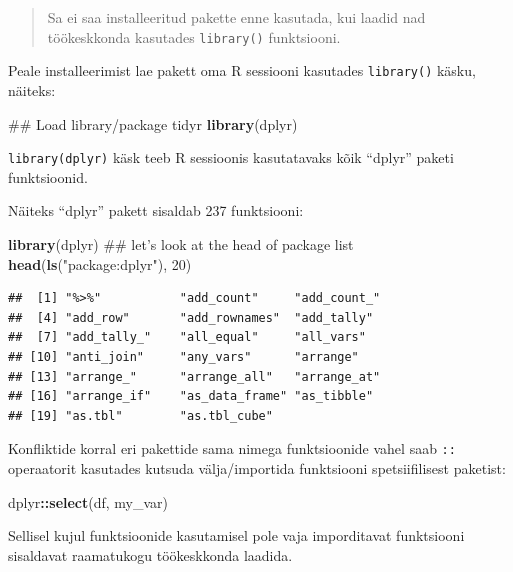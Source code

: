 \documentclass[]{book}
\newenvironment{Shaded}{\begin{snugshade}}{\end{snugshade}}
\newcommand{\KeywordTok}[1]{\textcolor[rgb]{0.13,0.29,0.53}{\textbf{#1}}}
\newcommand{\DecValTok}[1]{\textcolor[rgb]{0.00,0.00,0.81}{#1}}
\newcommand{\StringTok}[1]{\textcolor[rgb]{0.31,0.60,0.02}{#1}}
\newcommand{\OperatorTok}[1]{\textcolor[rgb]{0.81,0.36,0.00}{\textbf{#1}}}
\newcommand{\NormalTok}[1]{#1}
\begin{document}
\begin{quote}
Sa ei saa installeeritud pakette enne kasutada, kui laadid nad
töökeskkonda kasutades \texttt{library()} funktsiooni.
\end{quote}

Peale installeerimist lae pakett oma R sessiooni kasutades
\texttt{library()} käsku, näiteks:

\begin{Shaded}
\begin{Highlighting}[]
\NormalTok{## Load library/package tidyr}
\KeywordTok{library}\NormalTok{(dplyr)}
\end{Highlighting}
\end{Shaded}

\texttt{library(dplyr)} käsk teeb R sessioonis kasutatavaks kõik
``dplyr'' paketi funktsioonid.

Näiteks ``dplyr'' pakett sisaldab 237 funktsiooni:

\begin{Shaded}
\begin{Highlighting}[]
\KeywordTok{library}\NormalTok{(dplyr)}
\NormalTok{## let's look at the head of package list}
\KeywordTok{head}\NormalTok{(}\KeywordTok{ls}\NormalTok{(}\StringTok{"package:dplyr"}\NormalTok{), }\DecValTok{20}\NormalTok{)}
\end{Highlighting}
\end{Shaded}

\begin{verbatim}
##  [1] "%>%"           "add_count"     "add_count_"   
##  [4] "add_row"       "add_rownames"  "add_tally"    
##  [7] "add_tally_"    "all_equal"     "all_vars"     
## [10] "anti_join"     "any_vars"      "arrange"      
## [13] "arrange_"      "arrange_all"   "arrange_at"   
## [16] "arrange_if"    "as_data_frame" "as_tibble"    
## [19] "as.tbl"        "as.tbl_cube"
\end{verbatim}

Konfliktide korral eri pakettide sama nimega funktsioonide vahel saab
\texttt{::} operaatorit kasutades kutsuda välja/importida funktsiooni
spetsiifilisest paketist:

\begin{Shaded}
\begin{Highlighting}[]
\NormalTok{dplyr}\OperatorTok{::}\KeywordTok{select}\NormalTok{(df, my_var)}
\end{Highlighting}
\end{Shaded}

Sellisel kujul funktsioonide kasutamisel pole vaja imporditavat
funktsiooni sisaldavat raamatukogu töökeskkonda laadida.
\end{document}

